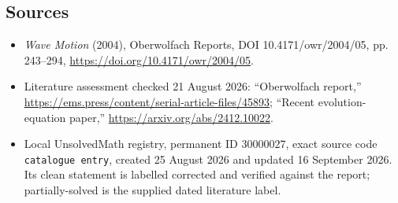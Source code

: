 \documentclass[11pt]{article}
\begin{document}
\subsection{Sources}
\begin{itemize}
\item \emph{Wave Motion} (2004), Oberwolfach Reports, DOI 10.4171/owr/2004/05, pp. 243--294, \url{https://doi.org/10.4171/owr/2004/05}.
\item Literature assessment checked 21 August 2026: ``Oberwolfach report,'' \url{https://ems.press/content/serial-article-files/45893}; ``Recent evolution-equation paper,'' \url{https://arxiv.org/abs/2412.10022}.
\item Local UnsolvedMath registry, permanent ID $30000027$, exact source code \texttt{catalogue entry}, created 25 August 2026 and updated 16 September 2026. Its clean statement is labelled corrected and verified against the report; partially-solved is the supplied dated literature label.
\end{itemize}
\end{document}
